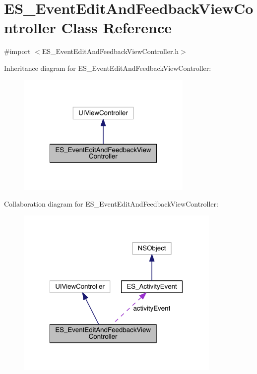 \hypertarget{interface_e_s___event_edit_and_feedback_view_controller}{\section{E\+S\+\_\+\+Event\+Edit\+And\+Feedback\+View\+Controller Class Reference}
\label{interface_e_s___event_edit_and_feedback_view_controller}
}


{\ttfamily \#import $<$E\+S\+\_\+\+Event\+Edit\+And\+Feedback\+View\+Controller.\+h$>$}



Inheritance diagram for E\+S\+\_\+\+Event\+Edit\+And\+Feedback\+View\+Controller\+:\nopagebreak
\begin{figure}[H]
\begin{center}
\leavevmode
\includegraphics[width=240pt]{d9/dca/interface_e_s___event_edit_and_feedback_view_controller__inherit__graph}
\end{center}
\end{figure}


Collaboration diagram for E\+S\+\_\+\+Event\+Edit\+And\+Feedback\+View\+Controller\+:\nopagebreak
\begin{figure}[H]
\begin{center}
\leavevmode
\includegraphics[width=280pt]{d2/dd8/interface_e_s___event_edit_and_feedback_view_controller__coll__graph}
\end{center}
\end{figure}
